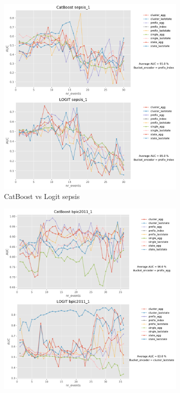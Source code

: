 \documentclass[twoside,11pt]{Latex/Classes/PhDthesisPSnPDF}
\begin{document}
\clearpage



\begin{figure}[t!] %
	
	\begin{subfigure}{0.48\textwidth}
		\includegraphics[width=\linewidth]{images/catboost/graphslogit/sepsis_1_CatBoost_logit.pdf}
		\caption{CatBoost vs Logit sepsis} \label{fig:sepsiscl}
	\end{subfigure}\hspace*{\fill}
	\begin{subfigure}{0.48\textwidth}
		\includegraphics[width=\linewidth]{images/catboost/graphslogit/bpic2011_1_CatBoost_logit.pdf}

\end{subfigure}
\end{figure}
\end{document}
